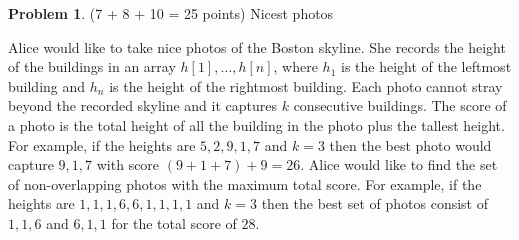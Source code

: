 \documentclass[11pt]{article}
\theoremstyle{definition}
\theoremstyle{theorem}
\newtheorem{prob}{Problem}
\begin{document}
\newpage

\begin{prob}
	(7 + 8 + 10 = 25 points) Nicest photos
\end{prob}

Alice would like to take nice photos of the Boston skyline. She records the height of the buildings in an array $h[1],\ldots, h[n]$, where $h_1$ is the height of the leftmost building and $h_n$ is the height of the rightmost building. Each photo cannot stray beyond the recorded skyline and it captures $k$ consecutive buildings. The score of a photo is the total height of all the building in the photo plus the tallest height. For example, if the heights are $5,2,9,1,7$ and $k=3$ then the best photo would capture $9,1,7$ with score $(9+1+7)+9 = 26$. Alice would like to find the set of non-overlapping photos with the maximum total score. For example, if the heights are $1,1,1,6,6,1,1,1,1$ and $k=3$ then the best set of photos consist of $1,1,6$ and $6,1,1$ for the total score of $28$.
\end{document}
